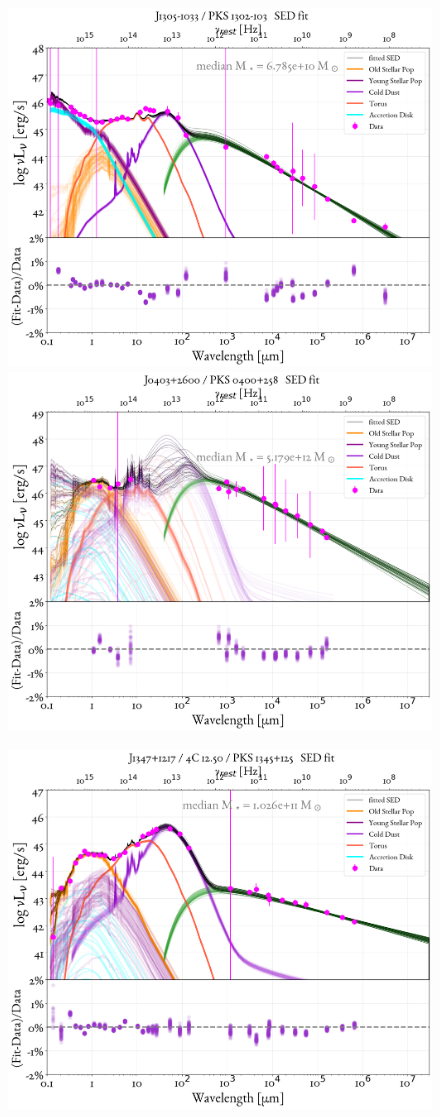 \begin{figure}
    \centering
    \includegraphics[width=0.85\linewidth]{figures/ResultFits/117_SEDfit_6001.png}\\
    \includegraphics[width=0.85\linewidth]{figures/ResultFits/118_SEDfit_6600.png}    
\end{figure}
\begin{figure}
    \centering
    \includegraphics[width=0.85\linewidth]{figures/ResultFits/119_SEDfit_8810.png}  
\end{figure}


